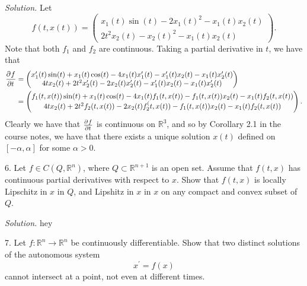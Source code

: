 \documentclass{article}
\newcommand{\R}{\mathbb{R}}
\begin{document}
\textit{Solution.}
Let
%
\begin{equation*}
    f(t, x(t)) =
    \begin{pmatrix}
        x_1(t) \sin(t) - 2 x_1(t)^2 - x_1(t) x_2(t) \\
        2 t^2 x_2(t) - x_2(t)^2 - x_1(t) x_2(t)
    \end{pmatrix}
    .
\end{equation*}
%
Note that both $f_1$ and $f_2$ are continuous. Taking a partial derivative
in $t$, we have that
%
\begin{align*}
    \dpd{f}{t}
    &=
    \begin{pmatrix}
        x_1^\prime(t) \sin(t)
            + x_1(t) \cos(t)
            - 4 x_1(t) x_1^\prime(t)
            - x_1^\prime(t) x_2(t)
            - x_1(t) x_2^\prime(t) \\
        4 t x_2(t)
            + 2 t^2 x_2^\prime(t)
            - 2 x_2(t) x_2^\prime(t)
            - x_1^\prime(t) x_2(t)
            - x_1(t) x_2^\prime(t)
    \end{pmatrix}
    \\
    &=
    \begin{pmatrix}
        f_1(t, x(t)) \sin(t)
            + x_1(t) \cos(t)
            - 4 x_1(t) f_1(t, x(t))
            - f_1(t, x(t)) x_2(t)
            - x_1(t) f_2(t, x(t)) \\
        4 t x_2(t)
            + 2 t^2 f_2(t, x(t))
            - 2 x_2(t) f_2^(t, x(t))
            - f_1(t, x(t)) x_2(t)
            - x_1(t) f_2(t, x(t))
    \end{pmatrix}
    .
\end{align*}
%
Clearly we have that $\pd{f}{t}$ is continuous on $\R^3$, and
so by Corollary 2.1 in the course notes, we have that there exists
a unique solution $x(t)$ defined on $[-\alpha, \alpha]$ for some
$\alpha > 0$.

\newpage

6. Let $f \in C(Q, \R^n)$, where $Q \subset \R^{n + 1}$ is an open set. Assume
that $f(t, x)$ has continuous partial derivatives with respect to $x$. Show that
$f(t, x)$ is locally Lipschitz in $x$ in $Q$, and Lipshitz in $x$ in $x$ on any compact
and convex subset of $Q$.

\textit{Solution.}
hey

\newpage

7. Let $f: \R^n \to \R^n$ be continuously differentiable. Show that two distinct solutions
of the autonomous system
%
\begin{equation*}
    x^\prime = f(x)
\end{equation*}
%
cannot intersect at a point, not even at different times.
\end{document}
